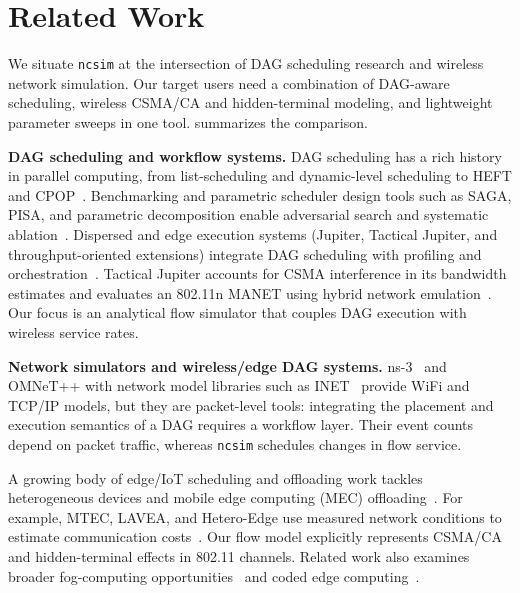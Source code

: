 \documentclass[conference]{IEEEtran}
\newcommand{\ncsim}{\texttt{ncsim}}
\begin{document}
\section{Related Work}
\label{sec:related}

We situate \ncsim{} at the intersection of DAG scheduling research and
wireless network simulation. Our target users need a combination of
DAG-aware scheduling, wireless CSMA/CA and hidden-terminal modeling,
and lightweight parameter sweeps in one
tool.   summarizes the comparison.

\textbf{DAG scheduling and workflow systems.}
DAG scheduling has a rich history in parallel computing, from
list-scheduling and dynamic-level scheduling to HEFT and
CPOP~\cite{Adam1974ListSchedules,KwokAhmad1999Survey,Sih1993DLS,heft}.
Benchmarking and parametric scheduler design tools such as SAGA, PISA,
and parametric decomposition enable adversarial search and systematic
ablation~\cite{Coleman2024PISA,SAGARepo,Coleman2024Parametric}.
Dispersed and edge execution systems (Jupiter, Tactical Jupiter, and
throughput-oriented extensions) integrate DAG scheduling with
profiling and orchestration~\cite{Ghosh2021Jupiter,Poylisher2021TacticalJupiter,Zhao2021TPHEFT}.
Tactical Jupiter accounts for CSMA interference in its bandwidth estimates
and evaluates an 802.11n MANET using hybrid network
emulation~\cite{Poylisher2021TacticalJupiter}. Our focus is an analytical
flow simulator that couples DAG execution with wireless service rates.

\textbf{Network simulators and wireless/edge DAG systems.}
ns-3~\cite{ns3} and OMNeT++ with network model libraries such as
INET~\cite{omnetpp} provide WiFi and TCP/IP models, but they are
packet-level tools: integrating the placement and execution semantics of
a DAG requires a workflow layer. Their event counts depend on packet
traffic, whereas \ncsim{} schedules changes in flow service. 

A growing body of edge/IoT scheduling and offloading
work tackles heterogeneous devices and mobile edge computing (MEC)
offloading~\cite{Suryavansh2020IBOT,Li2022IBDASH,Li2024MTEC,Yi2017LAVEA,Zhang2019HeteroEdge,Lin2019Petrel,Liang2021JointOffloading,Li2024EnergyConstrained,Long2025SecDS}.
For example, MTEC, LAVEA, and Hetero-Edge use measured network conditions
to estimate communication costs~\cite{Li2024MTEC,Yi2017LAVEA,Zhang2019HeteroEdge}.
Our flow model explicitly represents CSMA/CA and hidden-terminal effects
in 802.11 channels. Related work also
examines broader fog-computing opportunities~\cite{Chiang2016FogIoT,Chiang2017Fog10Q}
and coded edge computing~\cite{Kim2020CodedEdge}.
\end{document}
